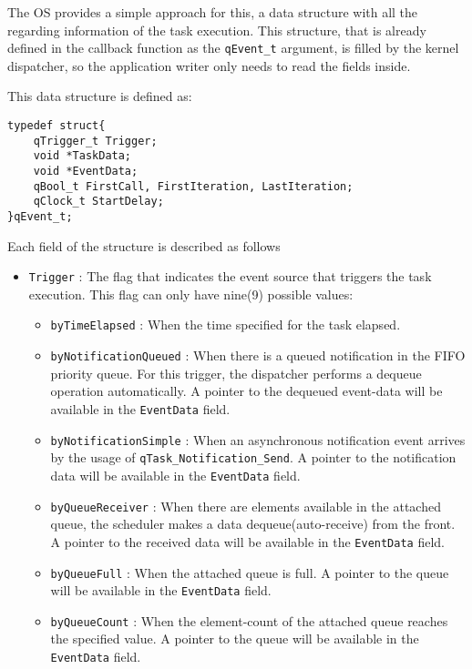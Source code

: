 The OS provides a simple approach for this, a data structure with all the regarding information of the task execution. This structure, that is already defined in the callback function as the \lstinline{qEvent_t} argument, is filled by the kernel dispatcher, so the application writer only needs to read the fields inside.

This data structure is defined as: 
\medskip

\begin{lstlisting}[style=CStyle]
typedef struct{
    qTrigger_t Trigger;
    void *TaskData;
    void *EventData;
    qBool_t FirstCall, FirstIteration, LastIteration;
    qClock_t StartDelay;
}qEvent_t;
\end{lstlisting}

Each field of the structure is described as follows
\begin{itemize}
    \item \lstinline{Trigger} : The flag that indicates the event source that triggers the task execution. This flag can only have nine(9) possible values:
    \begin{itemize}
        \item \lstinline{byTimeElapsed}  : When the time specified for the task elapsed.
        \item \lstinline{byNotificationQueued} : When there is a queued notification in the FIFO priority queue. For this trigger, the dispatcher performs a dequeue operation automatically. A pointer to the dequeued event-data will be available in the \lstinline{EventData}  field.
        \item \lstinline{byNotificationSimple} : When an asynchronous notification event  arrives by the usage of \lstinline{qTask_Notification_Send}. A pointer to the notification data will be available in the \lstinline{EventData} field.
        \item \lstinline{byQueueReceiver} : When there are elements available in the attached queue, the scheduler makes a data dequeue(auto-receive) from the front. A pointer to the received data will be available in the \lstinline{EventData} field.
        \item \lstinline{byQueueFull} : When the attached queue is full. A pointer to the queue will be available in the \lstinline{EventData} field.
        \item \lstinline{byQueueCount} : When the element-count of the  attached queue reaches
        the specified value. A pointer to the queue will be available in the \lstinline{EventData} field.

\end{itemize}
\end{itemize}
